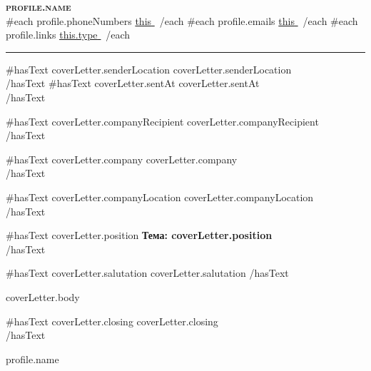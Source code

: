 \documentclass[a4paper,11pt]{letter}
\begin{document}
\begin{center}
  \textbf{\Huge\scshape {{profile.name}} } \\ \vspace{1pt}
  {{#each profile.phoneNumbers}} \small{\underline{ {{this}} }}\, {{/each}}
  {{#each profile.emails}} \small{\underline{ {{this}} }}\, {{/each}}
  {{#each profile.links}} \small{\href{ {{this.url}} }{\underline{ {{this.type}} }}}\, {{/each}}
\end{center}

\rule{\textwidth}{0.4pt}
\vspace{10pt}

\setlength{\lettercontentmargin}{0.4in}
\addtolength{\leftmargin}{\lettercontentmargin}
\addtolength{\rightmargin}{\lettercontentmargin}
\begin{adjustwidth}{}{}

\begin{flushright}
  {{#hasText coverLetter.senderLocation}}
    {{coverLetter.senderLocation}}\\
  {{/hasText}}
  {{#hasText coverLetter.sentAt}}
    \vspace{12pt}
    {{coverLetter.sentAt}}\\
  {{/hasText}}
\end{flushright}

\vspace{20pt}

{{#hasText coverLetter.companyRecipient}}
  {{coverLetter.companyRecipient}}\\
{{/hasText}}

{{#hasText coverLetter.company}}
  {{coverLetter.company}}\\
{{/hasText}}

{{#hasText coverLetter.companyLocation}}
  {{coverLetter.companyLocation}}\\
{{/hasText}}

\vspace{20pt}
{{#hasText coverLetter.position}}
  \textbf{Тема: {{coverLetter.position}} }\\
{{/hasText}}

\vspace{20pt}
{{#hasText coverLetter.salutation}}
  {{coverLetter.salutation}}
{{/hasText}}

\vspace{12pt}
{{{coverLetter.body}}}

\vspace{20pt}
{{#hasText coverLetter.closing}}
  {{coverLetter.closing}}\\
{{/hasText}}

\vspace{12pt}
{{profile.name}}\\

\end{adjustwidth}
\end{document}
